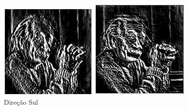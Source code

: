 \documentclass[a4paper, 12pt]{article}
\begin{document}
\begin{figure}[!htbp]
	\centering
	  	\includegraphics[width=\linewidth]{images/kirsch6.jpg}
	  	\caption{Direção Sul}
	\endminipage\hspace{1cm}
	 	\includegraphics[width=\linewidth]{images/kirsch7.jpg}

\end{figure}
\end{document}
